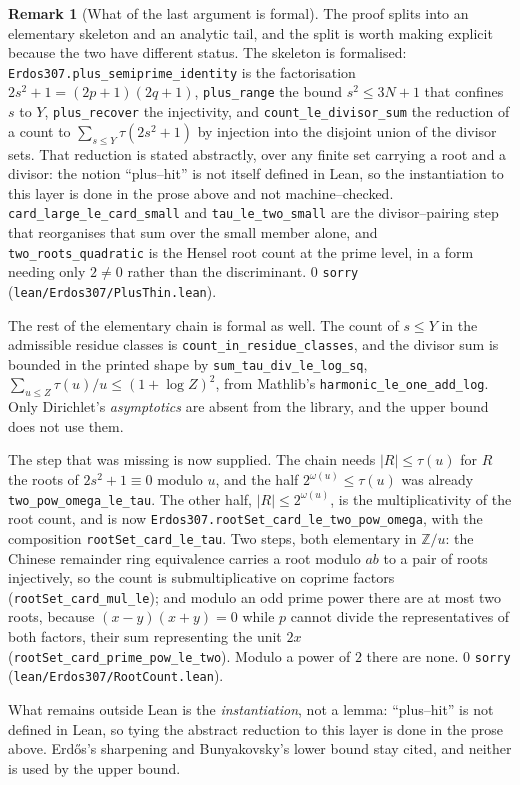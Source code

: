 \documentclass[11pt]{article}
\theoremstyle{definition}
\newtheorem{remark}[theorem]{Remark}
\begin{document}
\begin{remark}[What of the last argument is formal]\label{rem:plusthinformal}
The proof splits into an elementary skeleton and an analytic tail, and the split is worth making
explicit because the two have different status. The skeleton is formalised:
\texttt{Erdos307.plus\_semiprime\_identity} is the factorisation $2s^2+1=(2p+1)(2q+1)$,
\texttt{plus\_range} the bound $s^2\le3N+1$ that confines $s$ to $Y$, \texttt{plus\_recover} the
injectivity, and \texttt{count\_le\_divisor\_sum} the reduction of a count to
$\sum_{s\le Y}\tau(2s^2+1)$ by injection into the disjoint union of the divisor sets. That reduction
is stated abstractly, over any finite set carrying a root and a divisor: the notion ``plus--hit''
is not itself defined in Lean, so the instantiation to this layer is done in the prose above and not
machine--checked. \texttt{card\_large\_le\_card\_small} and \texttt{tau\_le\_two\_small} are the
divisor--pairing step that reorganises that sum over the small member alone, and
\texttt{two\_roots\_quadratic} is the Hensel root count at the prime level, in a form needing only
$2\ne0$ rather than the discriminant. $0$ \texttt{sorry}
\textup{(\texttt{lean/Erdos307/PlusThin.lean})}.

The rest of the elementary chain is formal as well. The count of $s\le Y$ in the admissible residue
classes is \texttt{count\_in\_residue\_classes}, and the divisor sum is bounded in the printed shape
by \texttt{sum\_tau\_div\_le\_log\_sq}, $\sum_{u\le Z}\tau(u)/u\le(1+\log Z)^2$, from Mathlib's
\texttt{harmonic\_le\_one\_add\_log}. Only Dirichlet's \emph{asymptotics} are absent from the
library, and the upper bound does not use them.

The step that was missing is now supplied. The chain needs $|R|\le\tau(u)$ for $R$ the roots of
$2s^2+1\equiv0$ modulo $u$, and the half $2^{\omega(u)}\le\tau(u)$ was already
\texttt{two\_pow\_omega\_le\_tau}. The other half, $|R|\le2^{\omega(u)}$, is the multiplicativity of
the root count, and is now \texttt{Erdos307.rootSet\_card\_le\_two\_pow\_omega}, with the
composition \texttt{rootSet\_card\_le\_tau}. Two steps, both elementary in $\mathbb{Z}/u$: the
Chinese remainder ring equivalence carries a root modulo $ab$ to a pair of roots injectively, so the
count is submultiplicative on coprime factors \textup{(}\texttt{rootSet\_card\_mul\_le}\textup{)};
and modulo an odd prime power there are at most two roots, because $(x-y)(x+y)=0$ while $p$ cannot
divide the representatives of both factors, their sum representing the unit $2x$
\textup{(}\texttt{rootSet\_card\_prime\_pow\_le\_two}\textup{)}. Modulo a power of $2$ there are
none. $0$ \texttt{sorry} \textup{(\texttt{lean/Erdos307/RootCount.lean})}.

What remains outside Lean is the \emph{instantiation}, not a lemma: ``plus--hit'' is not defined in
Lean, so tying the abstract reduction to this layer is done in the prose above. Erd\H{o}s's
sharpening and Bunyakovsky's lower bound stay cited, and neither is used by the upper bound.
\end{remark}
\end{document}
